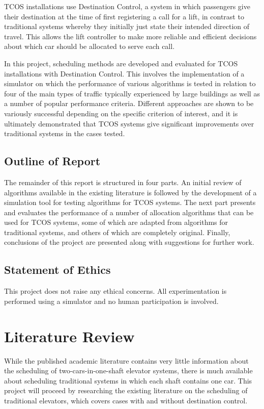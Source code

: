 \documentclass{UoYCSproject}
\begin{document}
TCOS installations use Destination Control, a system in which passengers give their destination at the time of first registering a call for a lift, in contrast to traditional systems whereby they initially just state their intended direction of travel.  This allows the lift controller to make more reliable and efficient decisions about which car should be allocated to serve each call.

In this project, scheduling methods are developed and evaluated for TCOS installations with Destination Control.  This involves the implementation of a simulator on which the performance of various algorithms is tested in relation to four of the main types of traffic typically experienced by large buildings as well as a number of popular performance criteria.  Different approaches are shown to be variously successful depending on the specific criterion of interest, and it is ultimately demonstrated that TCOS systems give significant improvements over traditional systems in the cases tested.

\section{Outline of Report}

The remainder of this report is structured in four parts.  An initial review of algorithms available in the existing literature is followed by the development of a simulation tool for testing algorithms for TCOS systems.  The next part presents and evaluates the performance of a number of allocation algorithms that can be used for TCOS systems, some of which are adapted from algorithms for traditional systems, and others of which are completely original.  Finally, conclusions of the project are presented along with suggestions for further work.

\section{Statement of Ethics}

This project does not raise any ethical concerns.  All experimentation is performed using a simulator and no human participation is involved.

\chapter{Literature Review}

While the published academic literature contains very little information about the scheduling of two-cars-in-one-shaft elevator systems, there is much available about scheduling traditional systems in which each shaft contains one car.  This project will proceed by researching the existing literature on the scheduling of traditional elevators, which covers cases with and without destination control.
\end{document}

